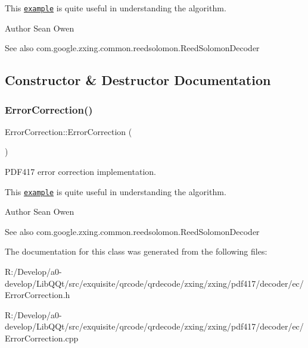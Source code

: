 This \href{http://en.wikipedia.org/wiki/Reed%E2%80%93Solomon_error_correction#Example}{\tt example} is quite useful in understanding the algorithm.

\begin{DoxyAuthor}{Author}
Sean Owen 
\end{DoxyAuthor}
\begin{DoxySeeAlso}{See also}
com.\+google.\+zxing.\+common.\+reedsolomon.\+Reed\+Solomon\+Decoder 
\end{DoxySeeAlso}


\subsection{Constructor \& Destructor Documentation}
\mbox{\label{classzxing_1_1pdf417_1_1decoder_1_1ec_1_1_error_correction_ac9823bc68404accf4279fe6173958bb8}} 
\subsubsection{\texorpdfstring{Error\+Correction()}{ErrorCorrection()}}
{\footnotesize\ttfamily Error\+Correction\+::\+Error\+Correction (\begin{DoxyParamCaption}{ }\end{DoxyParamCaption})}

P\+D\+F417 error correction implementation.

This \href{http://en.wikipedia.org/wiki/Reed%E2%80%93Solomon_error_correction#Example}{\tt example} is quite useful in understanding the algorithm.

\begin{DoxyAuthor}{Author}
Sean Owen 
\end{DoxyAuthor}
\begin{DoxySeeAlso}{See also}
com.\+google.\+zxing.\+common.\+reedsolomon.\+Reed\+Solomon\+Decoder 
\end{DoxySeeAlso}


The documentation for this class was generated from the following files\+:\begin{DoxyCompactItemize}
\item 
R\+:/\+Develop/a0-\/develop/\+Lib\+Q\+Qt/src/exquisite/qrcode/qrdecode/zxing/zxing/pdf417/decoder/ec/Error\+Correction.\+h\item 
R\+:/\+Develop/a0-\/develop/\+Lib\+Q\+Qt/src/exquisite/qrcode/qrdecode/zxing/zxing/pdf417/decoder/ec/Error\+Correction.\+cpp\end{DoxyCompactItemize}
